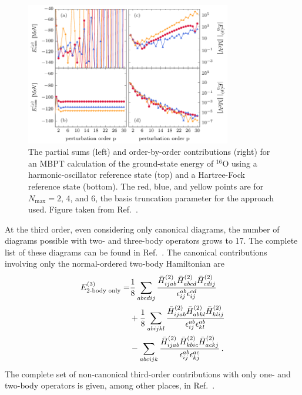 \begin{figure}[t!]
  \centering
  \includegraphics[width=0.8\textwidth]{thesis/doc/images/external/ho_vs_hf_mbpt.pdf}
  \caption[
    The partial sums (left) and order-by-order contributions (right)
    for an MBPT calculation of the ground-state energy of ${}^{16}\text{O}$
    using a harmonic-oscillator reference state (top)
    and a Hartree-Fock reference state (bottom).
    The red, blue, and yellow points are for $N_{\text{max}}=2$, 4, and 6,
    the basis truncation parameter for the approach used.
  ]{
    The partial sums (left) and order-by-order contributions (right)
    for an MBPT calculation of the ground-state energy of ${}^{16}\text{O}$
    using a harmonic-oscillator reference state (top)
    and a Hartree-Fock reference state (bottom).
    The red, blue, and yellow points are for $N_{\text{max}}=2$, 4, and 6,
    the basis truncation parameter for the approach used.
    Figure taken from Ref.~\cite{Tich16hohfmbpt}.
  }\label{fig:ho_vs_hf_mbpt}
\end{figure}

At the third order, even considering only canonical diagrams,
the number of diagrams possible with two- and three-body operators grows to 17.
The complete list of these diagrams can be found in Ref.~\cite{Hu18mbptthreebody}.
The canonical contributions involving only the normal-ordered two-body Hamiltonian are
\begin{equation}
  \begin{split}
    E^{(3)}_{\text{2-body only}} =
    &\frac{1}{8} \sum_{abcdij} \frac{{\bar{H}}^{(2)}_{ijab} {\bar{H}}^{(2)}_{abcd}{\bar{H}}^{(2)}_{cdij}}{\epsilon_{ij}^{ab}\epsilon_{ij}^{cd}} \\
    &+ \frac{1}{8} \sum_{abijkl} \frac{{\bar{H}}^{(2)}_{ijab} {\bar{H}}^{(2)}_{abkl}{\bar{H}}^{(2)}_{klij}}{\epsilon_{ij}^{ab}\epsilon_{kl}^{ab}} \\
    &- \sum_{abcijk} \frac{{\bar{H}}^{(2)}_{ijab} {\bar{H}}^{(2)}_{kbic}{\bar{H}}^{(2)}_{ackj}}{\epsilon_{ij}^{ab}\epsilon_{kj}^{ac}}\,.
  \end{split}
\end{equation}
The complete set of non-canonical third-order contributions
with only one- and two-body operators
is given, among other places, in Ref.~\cite{Tich17phd}.

